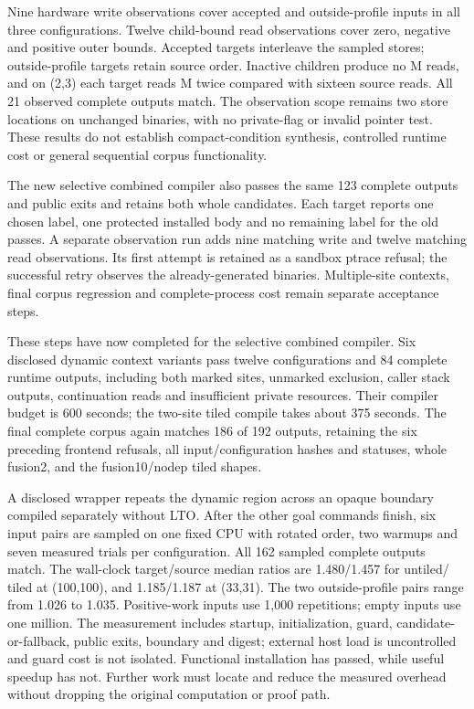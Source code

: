 Nine hardware write observations cover accepted and outside-profile inputs in
all three configurations. Twelve child-bound read observations cover zero,
negative and positive outer bounds. Accepted targets interleave the sampled
stores; outside-profile targets retain source order. Inactive children produce
no M reads, and on (2,3) each target reads M twice compared with sixteen source
reads. All 21 observed complete outputs match. The observation scope remains
two store locations on unchanged binaries, with no private-flag or invalid
pointer test. These results do not establish compact-condition synthesis,
controlled runtime cost or general sequential corpus functionality.

The new selective combined compiler also passes the same 123 complete outputs
and public exits and retains both whole candidates. Each target reports one
chosen label, one protected installed body and no remaining label for the old
passes. A separate observation run adds nine matching write and twelve matching
read observations. Its first attempt is retained as a sandbox ptrace refusal;
the successful retry observes the already-generated binaries. Multiple-site
contexts, final corpus regression and complete-process cost remain separate
acceptance steps.

These steps have now completed for the selective combined compiler. Six
disclosed dynamic context variants pass twelve configurations and 84 complete
runtime outputs, including both marked sites, unmarked exclusion, caller stack
outputs, continuation reads and insufficient private resources. Their compiler
budget is 600 seconds; the two-site tiled compile takes about 375 seconds.
The final complete corpus again matches 186 of 192 outputs, retaining the six
preceding frontend refusals, all input/configuration hashes and statuses, whole
fusion2, and the fusion10/nodep tiled shapes.

A disclosed wrapper repeats the dynamic region across an opaque boundary
compiled separately without LTO. After the other goal commands finish, six
input pairs are sampled on one fixed CPU with rotated order, two warmups and
seven measured trials per configuration. All 162 sampled complete outputs
match. The wall-clock target/source median ratios are 1.480/1.457 for untiled/
tiled at (100,100), and 1.185/1.187 at (33,31). The two outside-profile pairs
range from 1.026 to 1.035. Positive-work inputs use 1,000 repetitions; empty
inputs use one million. The measurement includes startup, initialization,
guard, candidate-or-fallback, public exits, boundary and digest; external host
load is uncontrolled and guard cost is not isolated. Functional installation
has passed, while useful speedup has not. Further work must locate and reduce
the measured overhead without dropping the original computation or proof path.

